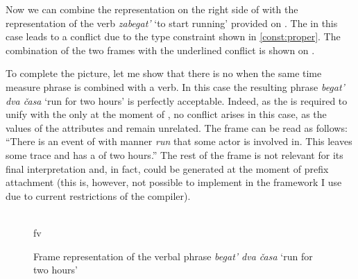Now we can combine the representation on the right side of  with the representation of the verb \textit{zabegat'} `to start running' provided on . The  in this case leads to a conflict due to the type constraint shown in \ref{const:proper}. The combination of the two frames with the underlined conflict is shown on . 

To complete the picture, let me show that there is no  when the same time measure phrase is combined with a  verb. In this case the resulting phrase \textit{begat' dva \v{c}asa} `run for two hours' is perfectly acceptable. Indeed, as the  is required to unify with the  only at the moment of , no conflict arises in this case, as the values of the attributes {\scshape\MDIM} and {\scshape\VERBDIM} remain unrelated. The frame can be read as follows: ``There is an event of  with manner \textit{run} that some actor is involved in. This  leaves some trace and has a  of two hours.'' The rest of the frame is not relevant for its final interpretation and, in fact, could be generated at the moment of prefix attachment (this is, however, not possible to implement in the framework I use due to current restrictions of the compiler).

\begin{figure}
\centering
{}\\fv
\caption{Frame representation of the verbal phrase \textit{begat' dva \v{c}asa} `run for two hours' \label{frame:begat:2hours}}
\end{figure}

